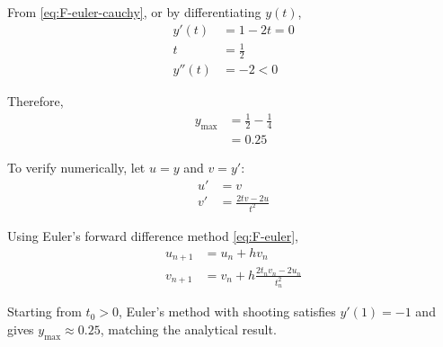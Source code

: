\begin{enumerate}[label=\thesubsection.\arabic*, ref=\thesubsection.\theenumi]
From \eqref{eq:F-euler-cauchy}, or by differentiating $y(t)$,
\begin{align}
y'(t)&=1-2t=0\\
t&=\frac12\\
y''(t)&=-2<0
\end{align}

Therefore,
\begin{align}
y_{\max}&=\frac12-\frac14\\
&=\boxed{0.25}
\end{align}

To verify numerically, let $u=y$ and $v=y'$:
\begin{align}
u'&=v\\
v'&=\frac{2tv-2u}{t^2}
\end{align}

Using Euler's forward difference method \eqref{eq:F-euler},
\begin{align}
u_{n+1}&=u_n+hv_n\\
v_{n+1}&=v_n+h\frac{2t_nv_n-2u_n}{t_n^2}
\end{align}

Starting from $t_0>0$, Euler's method with shooting satisfies $y'(1)=-1$ and gives $y_{\max}\approx0.25$, matching the analytical result.


\end{enumerate}
